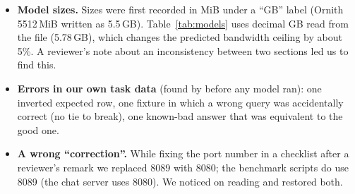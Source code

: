 \begin{itemize}
\item \textbf{Model sizes.} Sizes were first recorded in MiB under a ``GB'' label (Ornith 5512\,MiB written as 5.5\,GB). Table~\ref{tab:models} uses decimal GB read from the file (5.78\,GB), which changes the predicted bandwidth ceiling by about 5\%. A reviewer's note about an inconsistency between two sections led us to find this.
\item \textbf{Errors in our own task data} (found by  before any model ran): one inverted expected row, one fixture in which a wrong query was accidentally correct (no tie to break), one known-bad answer that was equivalent to the good one.
\item \textbf{A wrong ``correction''.} While fixing the port number in a checklist after a reviewer's remark we replaced 8089 with 8080; the benchmark scripts do use 8089 (the chat server uses 8080). We noticed on reading  and restored both.
\end{itemize}
